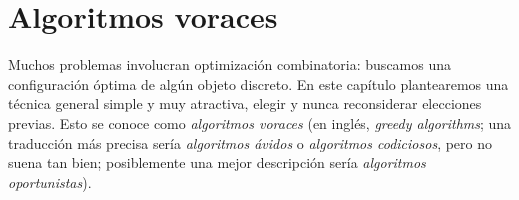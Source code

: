 

\chapter{Algoritmos voraces}
\label{cha:greedy-algorithm}

  Muchos problemas involucran optimización combinatoria:
  buscamos una configuración óptima de algún objeto discreto.
  En este capítulo plantearemos una técnica general simple y muy atractiva,
  elegir 
  y nunca reconsiderar elecciones previas.
  Esto se conoce como \emph{algoritmos voraces}
  (en inglés,
   \emph{\foreignlanguage{english}{greedy algorithms}};
   una traducción más precisa sería \emph{algoritmos ávidos}
   o \emph{algoritmos codiciosos},
   pero no suena tan bien;
   posiblemente una mejor descripción sería \emph{algoritmos oportunistas}).

